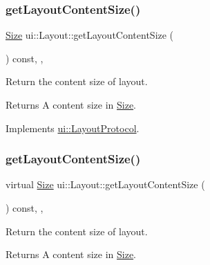 \subsubsection{\texorpdfstring{get\+Layout\+Content\+Size()}{getLayoutContentSize()}\hspace{0.1cm}{\footnotesize\ttfamily [1/2]}}
{\footnotesize\ttfamily \hyperlink{classSize}{Size} ui\+::\+Layout\+::get\+Layout\+Content\+Size (\begin{DoxyParamCaption}{ }\end{DoxyParamCaption}) const\hspace{0.3cm}{\ttfamily [override]}, {\ttfamily [protected]}, {\ttfamily [virtual]}}



Return the content size of layout. 

\begin{DoxyReturn}{Returns}
A content size in \hyperlink{classSize}{Size}. 
\end{DoxyReturn}


Implements \hyperlink{classui_1_1LayoutProtocol_afacf70c8ceec076a9c1237427cbd614a}{ui\+::\+Layout\+Protocol}.

\mbox{\label{classui_1_1Layout_a75eb33c244061dd6ab91a37536fd5b8f}} 
\subsubsection{\texorpdfstring{get\+Layout\+Content\+Size()}{getLayoutContentSize()}\hspace{0.1cm}{\footnotesize\ttfamily [2/2]}}
{\footnotesize\ttfamily virtual \hyperlink{classSize}{Size} ui\+::\+Layout\+::get\+Layout\+Content\+Size (\begin{DoxyParamCaption}{ }\end{DoxyParamCaption}) const\hspace{0.3cm}{\ttfamily [override]}, {\ttfamily [protected]}, {\ttfamily [virtual]}}



Return the content size of layout. 

\begin{DoxyReturn}{Returns}
A content size in \hyperlink{classSize}{Size}. 
\end{DoxyReturn}


